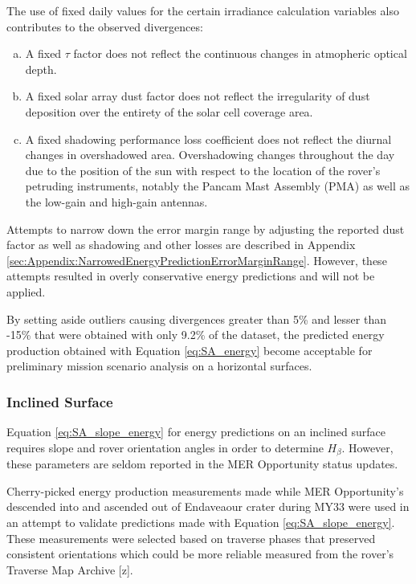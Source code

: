 
The use of fixed daily values for the certain irradiance calculation variables also contributes to the observed divergences:
\begin{enumerate}[(a)]
  \item A fixed $\tau$ factor does not reflect the continuous changes in atmopheric optical depth.
  \item A fixed solar array dust factor does not reflect the irregularity of dust deposition over the entirety of the solar cell coverage area.
  \item A fixed shadowing performance loss coefficient does not reflect the diurnal changes in overshadowed area. Overshadowing changes throughout the day due to the position of the sun with respect to the location of the rover's petruding instruments, notably the Pancam Mast Assembly (PMA) as well as the low-gain and high-gain antennas.
\end{enumerate}

Attempts to narrow down the error margin range by adjusting the reported dust factor as well as shadowing and other losses are described in Appendix \ref{sec:Appendix:NarrowedEnergyPredictionErrorMarginRange}. However, these attempts resulted in overly conservative energy predictions and will not be applied.

By setting aside outliers causing divergences greater than 5\% and lesser than -15\% that were obtained with only 9.2\% of the dataset, the predicted energy production obtained with Equation \ref{eq:SA_energy} become acceptable for preliminary mission scenario analysis on a horizontal surfaces.

\subsubsection{Inclined Surface}
\label{sec:PowerAndEnergyPredictions:Validation:InclinedSurface}

Equation \ref{eq:SA_slope_energy} for energy predictions on an inclined surface requires slope and rover orientation angles in order to determine $H_{\beta}$. However, these parameters are seldom reported in the \ac{MER} Opportunity status updates.

Cherry-picked energy production measurements made while \ac{MER} Opportunity's descended into and ascended out of Endaveaour crater during MY33 were used in an attempt to validate predictions made with Equation \ref{eq:SA_slope_energy}. These measurements were selected based on traverse phases that preserved consistent orientations which could be more reliable measured from the rover's Traverse Map Archive [z].

